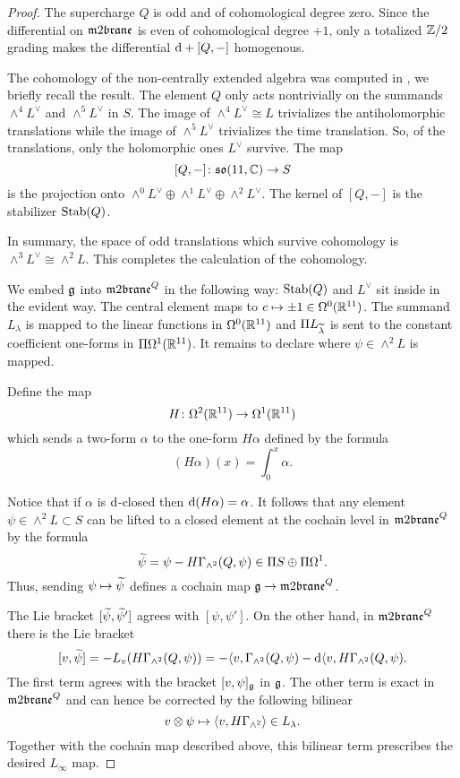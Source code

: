 \documentclass[11pt]{amsart}
\begin{document}
\begin{proof}
The supercharge $Q$ is odd and of cohomological degree zero.
Since the differential on $\m2$ is even of cohomological degree $+1$, only a totalized $\ZZ/2$ grading makes the differential $\d + [Q,-]$ homogenous. 

The cohomology of the non-centrally extended algebra was computed in \cite{SWspinor}, we briefly recall the result. 
The element $Q$ only acts nontrivially on the summands $\wedge^4 L^\vee$ and $\wedge^5 L^\vee$ in $S$. 
The image of $\wedge^4 L^\vee \cong L$ trivializes the antiholomorphic translations while the image of $\wedge^5 L^\vee$ trivializes the time translation.
So, of the translations, only the holomorphic ones $L^\vee$ survive.
The map 
\[
[Q,-] \colon \lie{so}(11,\CC) \to S 
\] 
is the projection onto $\wedge^0 L^\vee \oplus \wedge^1 L^\vee \oplus \wedge^2 L^\vee$. 
The kernel of $[Q,-]$ is the stabilizer ${\rm Stab}(Q)$.

In summary, the space of odd translations which survive cohomology is $\wedge^3 L^\vee \cong \wedge^2 L$.
This completes the calculation of the cohomology. 

We embed $\fg$ into $\m2^Q$ in the following way: ${\rm Stab}(Q)$ and $L^\vee$ sit inside in the evident way.
The central element maps to $c \mapsto \pm 1 \in \Omega^0(\RR^{11})$.
The summand $L_\lambda$ is mapped to the linear functions in $\Omega^0(\RR^{11})$ and $\Pi L_{\Tilde{\lambda}}$ is sent to the constant coefficient one-forms in $\Pi \Omega^1(\RR^{11})$. 
It remains to declare where $\psi \in \wedge^2 L$ is mapped.

Define the map
\[
H \colon \Omega^2 (\RR^{11}) \to \Omega^1(\RR^{11})
\]
which sends a two-form $\alpha$ to the one-form $H \alpha$ defined by the formula
\[
(H \alpha) (x) = \int_0^x \alpha .
\]

Notice that if $\alpha$ is $\d$-closed then $\d (H \alpha) = \alpha$. 
It follows that any element $\psi \in \wedge^2 L \subset S$ can be lifted to a closed element at the cochain level in $\m2^Q$ by the formula
\[
\Tilde{\psi} = \psi - H \Gamma_{\wedge^2} (Q, \psi) \in \Pi S \oplus \Pi \Omega^1 .
\]
Thus, sending $\psi \mapsto \Tilde{\psi}$ defines a cochain map $\fg \to \m2^Q$. 

The Lie bracket $[\Tilde{\psi}, \Tilde{\psi}']$ agrees with $[\psi, \psi']$. 
On the other hand, in $\m2^Q$ there is the Lie bracket 
\[
[v,\Tilde{\psi}] = - L_v (H \Gamma_{\wedge^2} (Q, \psi)) = -\<v, \Gamma_{\wedge^2}(Q, \psi) - \d \<v, H \Gamma_{\wedge^2}(Q, \psi) .
\]
The first term agrees with the bracket $[v, \psi]_{\fg}$ in $\fg$. 
The other term is exact in $\m2^Q$ and can hence be corrected by the following bilinear  
\[
v \otimes \psi \mapsto \<v, H \Gamma_{\wedge^2} \> \in L_\lambda .
\] 
Together with the cochain map described above, this bilinear term prescribes the desired $L_\infty$ map. 

\end{proof}
\end{document}
